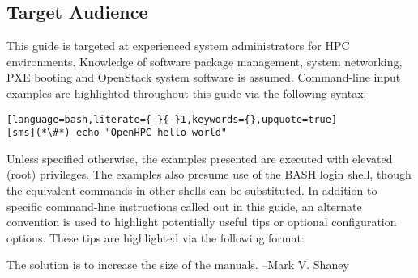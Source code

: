 \subsection{Target Audience}

This guide is targeted at experienced \Linux{} system administrators 
for HPC environments. Knowledge of software package management, system 
networking, PXE booting and OpenStack system software is assumed. 
Command-line input examples are highlighted throughout this guide via the 
following syntax:

\begin{lstlisting}[language=bash,literate={-}{-}1,keywords={},upquote=true]
[sms](*\#*) echo "OpenHPC hello world"
\end{lstlisting}

Unless specified otherwise, the examples presented are executed with
elevated (root) privileges. The examples also presume use of the BASH login
shell, though the equivalent commands in other shells can be substituted.
In addition to specific command-line instructions called out in this guide, an
alternate convention is used to highlight potentially useful tips or optional
configuration options. These tips are highlighted via the following format:

\begin{center}
\begin{tcolorbox}[]
\small
The solution is to increase the size of the manuals. --Mark V. Shaney
\end{tcolorbox}
\end{center}

